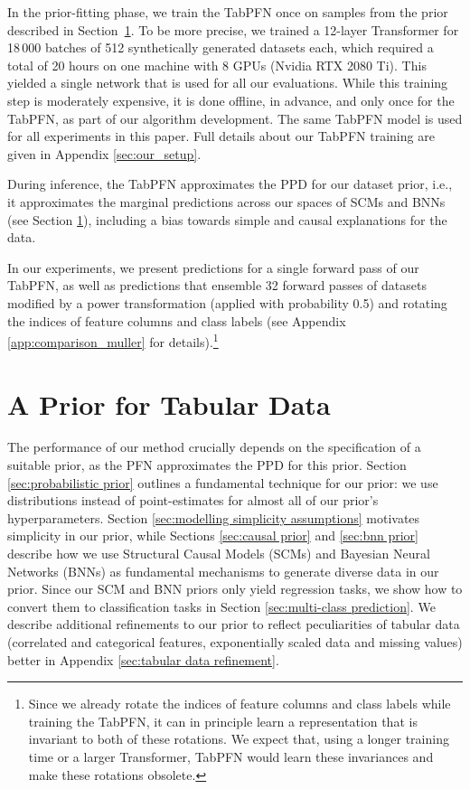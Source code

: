 In the prior-fitting phase, we train the TabPFN once on samples from the prior described in Section~\ref{sec:tabprior}. To be more precise, we trained a 12-layer Transformer for 18\,000 batches of 512 synthetically generated datasets each, which required a total of 20 hours on one machine with 8 GPUs (Nvidia RTX 2080 Ti). This yielded a single network that is used for all our evaluations. While this training step is moderately expensive, it is done offline, in advance, and only once for the TabPFN, as part of our algorithm development. The same TabPFN model is used for all experiments in this paper. Full details about our TabPFN training are given in Appendix \ref{sec:our_setup}.

During inference, the TabPFN approximates the PPD for our dataset prior, i.e., it approximates the marginal predictions across our spaces of SCMs and BNNs (see Section \ref{sec:tabprior}), including a bias towards simple and causal explanations for the data.

In our experiments, we present predictions for a single forward pass of our TabPFN, as well as predictions that ensemble 32 forward passes of datasets modified by a power transformation (applied with probability 0.5) and rotating the indices of feature columns and class labels (see Appendix \ref{app:comparison_muller} for details).\footnote{Since we already rotate the indices of feature columns and class labels while training the TabPFN, it can in principle learn a representation that is invariant to both of these rotations. We expect that, using a longer training time or a larger Transformer, TabPFN would learn these invariances and make these rotations obsolete.}

\section{A Prior for Tabular Data}\label{sec:tabprior}

The performance of our method crucially depends on the specification of a suitable prior, as the PFN approximates the PPD for this prior. Section \ref{sec:probabilistic prior} outlines a fundamental technique for our prior: we use distributions instead of point-estimates for almost all of our prior's hyperparameters. Section \ref{sec:modelling simplicity assumptions} motivates simplicity in our prior, while Sections \ref{sec:causal prior} and \ref{sec:bnn prior} describe how we use Structural Causal Models (SCMs) and Bayesian Neural Networks (BNNs) as fundamental mechanisms to generate diverse data in our prior. Since our SCM and BNN priors only yield regression tasks, we show how to convert them to classification tasks in Section \ref{sec:multi-class prediction}. We describe additional refinements to our prior to reflect peculiarities of tabular data (correlated and categorical features, exponentially scaled data and missing values) better in Appendix \ref{sec:tabular data refinement}.

